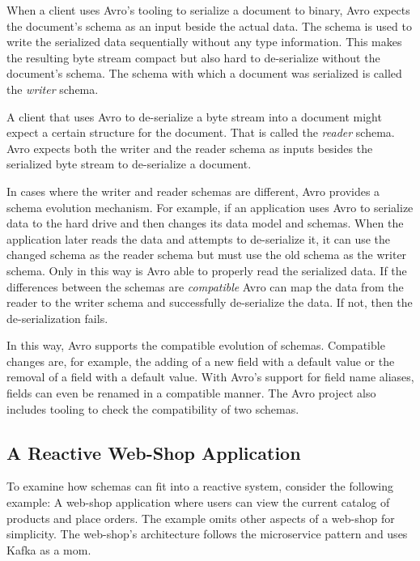 When a client uses Avro's tooling to serialize a document to binary, Avro expects the document's schema as an input beside the actual data.
The schema is used to write the serialized data sequentially without any type information. 
This makes the resulting byte stream compact but also hard to de-serialize without the document's schema.
The schema with which a document was serialized is called the \emph{writer} schema.
\parencite{avro}

A client that uses Avro to de-serialize a byte stream into a document might expect a certain structure for the document.
That is called the \emph{reader} schema.
Avro expects both the writer and the reader schema as inputs besides the serialized byte stream to de-serialize a document.
\parencite{avro}

In cases where the writer and reader schemas are different, Avro provides a schema evolution mechanism.
For example, if an application uses Avro to serialize data to the hard drive and then changes its data model and schemas.
When the application later reads the data and attempts to de-serialize it, it can use the changed schema as the reader schema but must use the old schema as the writer schema.
Only in this way is Avro able to properly read the serialized data.
If the differences between the schemas are \emph{compatible} Avro can map the data from the reader to the writer schema and successfully de-serialize the data.
If not, then the de-serialization fails.
\parencite{avro}

In this way, Avro supports the compatible evolution of schemas.
Compatible changes are, for example, the adding of a new field with a default value or the removal of a field with a default value.
With Avro's support for field name aliases, fields can even be renamed in a compatible manner.
The Avro project also includes tooling to check the compatibility of two schemas.
\parencite{avro}


\subsection{A Reactive Web-Shop Application}\label{sec:web-shop}

To examine how schemas can fit into a reactive system, consider the following example:
A web-shop application where users can view the current catalog of products and place orders.
The example omits other aspects of a web-shop for simplicity.
The web-shop's architecture follows the microservice pattern and uses Kafka as a \gls{mom}.


